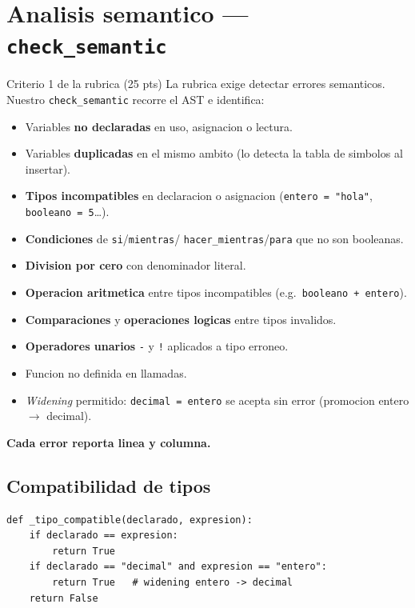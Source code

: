 \documentclass[11pt,a4paper]{article}
\begin{document}
\section{Analisis semantico --- \texttt{check\_semantic}}

\begin{rubrica}{Criterio 1 de la rubrica (25 pts)}
La rubrica exige detectar errores semanticos. Nuestro
\texttt{check\_semantic} recorre el AST e identifica:
\begin{itemize}[leftmargin=*,nosep]
  \item Variables \textbf{no declaradas} en uso, asignacion o lectura.
  \item Variables \textbf{duplicadas} en el mismo ambito (lo detecta la
        tabla de simbolos al insertar).
  \item \textbf{Tipos incompatibles} en declaracion o asignacion
        (\texttt{entero = "hola"}, \texttt{booleano = 5}\dots).
  \item \textbf{Condiciones} de \texttt{si}/\texttt{mientras}/
        \texttt{hacer\_mientras}/\texttt{para} que no son booleanas.
  \item \textbf{Division por cero} con denominador literal.
  \item \textbf{Operacion aritmetica} entre tipos incompatibles
        (e.g.\ \texttt{booleano + entero}).
  \item \textbf{Comparaciones} y \textbf{operaciones logicas} entre
        tipos invalidos.
  \item \textbf{Operadores unarios} \texttt{-} y \texttt{!} aplicados a
        tipo erroneo.
  \item Funcion no definida en llamadas.
  \item \emph{Widening} permitido: \texttt{decimal = entero} se acepta
        sin error (promocion entero $\rightarrow$ decimal).
\end{itemize}
\textbf{Cada error reporta linea y columna.}
\end{rubrica}

\subsection{Compatibilidad de tipos}

\begin{lstlisting}[style=py]
def _tipo_compatible(declarado, expresion):
    if declarado == expresion:
        return True
    if declarado == "decimal" and expresion == "entero":
        return True   # widening entero -> decimal
    return False
\end{lstlisting}
\end{document}
